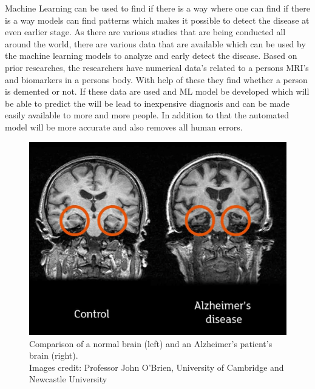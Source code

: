 \documentclass[12pt,onecolumn]{report}
\begin{document}
Machine Learning can be used to find if there is a way where one can find if there is a way models can find patterns which makes it possible to detect the disease at even earlier stage. As there are various studies that are being conducted all around the world, there are various data that are available which can be used by the machine learning models to analyze and early detect the disease. Based on prior researches, the researchers have numerical data's related to a persons MRI's and biomarkers in a persons body. With help of these they find whether a person is demented or not. If these data are used and ML model be developed which will be able to predict the will be lead to inexpensive diagnosis and can be made easily available to more and more people. In addition to that the automated model will be more accurate and also removes all human errors. 

\begin{figure}[h!]
    \centering
    \includegraphics[width=0.8\columnwidth]{figures/fig1.png}  %
    \caption{Comparison of a normal brain (left) and an Alzheimer's patient's brain (right).\\Images credit: Professor John O'Brien, University of Cambridge and Newcastle University} %
    \label{fig:alzheimers_brain} %
\end{figure}
\end{document}

